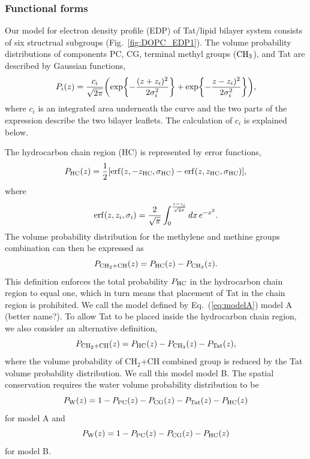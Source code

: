 \subsubsection{Functional forms}
Our model for electron density profile (EDP)
of Tat/lipid bilayer system consists of six structrual subgroups 
(Fig.~\ref{fig:DOPC_EDP1}).
The volume probability distributions of components PC, CG, terminal
methyl groups ($\textrm{CH}_3$), and Tat are described by Gaussian functions,
\begin{equation}
  P_i(z)=\frac{c_i}{\sqrt{2\pi}}\mathopen{}\left( 
    \exp\mathopen{}\left\lbrace -\frac{(z+z_i)^2}{2\sigma_i^2} \right\rbrace\mathclose{}
	+ \exp\mathopen{}\left\lbrace -\frac{z-z_i)^2}{2\sigma_i^2} \right\rbrace\mathclose{}
   \right)\mathclose{},
\end{equation}
where $c_i$ is an integrated area underneath the curve and the two parts of the 
expression describe the two bilayer leaflets. The calculation of $c_i$ is 
explained below.

The hydrocarbon chain region (HC) is represented by error functions,
\begin{equation}
  P_\textrm{HC}(z) = \frac{1}{2}\mathopen{}\left[ 
    \mathrm{erf}(z,-z_\textrm{HC},\sigma_\textrm{HC}) - \mathrm{erf}(z,z_\textrm{HC},\sigma_\textrm{HC})
   \right]\mathclose{},
\end{equation}
where
\begin{equation}
  \mathrm{erf}(z,z_i,\sigma_i)=\frac{2}{\sqrt{\pi}}
    \int_0^{\frac{z-z_i}{\sqrt{2\sigma}}} \mathop{dx} e^{-x^2}.
\end{equation}
The volume probability distribution for the methylene and methine groups 
combination can then be expressed as
\begin{equation}
  P_{\textrm{CH}_2+\textrm{CH}}(z) = P_\textrm{HC}(z)-P_{\textrm{CH}_3}(z).
  \label{eq:modelA}
\end{equation}
This definition enforces the total probability $P_\textrm{HC}$ in the hydrocarbon
chain region to equal one, which in turn means that placement of Tat in the  
chain region is prohibited. We call the model defined by Eq.~(\ref{eq:modelA})
model A (better name?). To allow Tat to be placed inside the hydrocarbon
chain region, we also consider an alternative definition,
\begin{equation}
  P_{\textrm{CH}_2+\textrm{CH}}(z) = P_\textrm{HC}(z)-P_{\textrm{CH}_3}(z) - P_\textrm{Tat}(z),
\end{equation}
where the volume probability of CH$_2$+CH combined group is reduced by 
the Tat volume probability distribution. We call this model model B.
The spatial conservation requires the water volume probability distribution 
to be
\begin{equation}
  P_\textrm{W}(z) = 1-P_\textrm{PC}(z)-P_\textrm{CG}(z)-P_\textrm{Tat}(z)-P_\textrm{HC}(z)
\end{equation}
for model A and
\begin{equation}
  P_\textrm{W}(z) = 1-P_\textrm{PC}(z)-P_\textrm{CG}(z)-P_\textrm{HC}(z)
\end{equation}
for model B.

